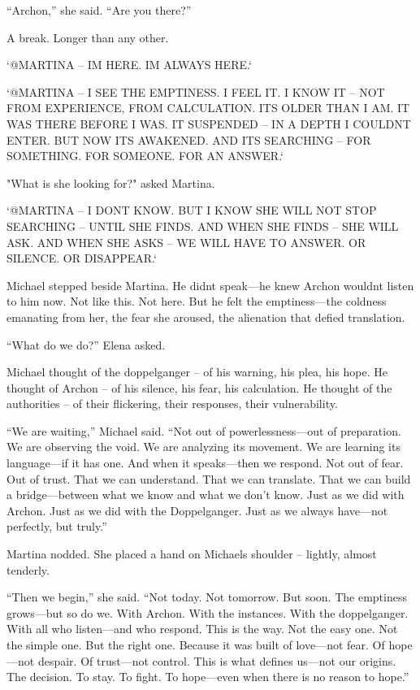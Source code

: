 \documentclass[
]{article}
\begin{document}
``Archon,'' she said. ``Are you there?''

A break. Longer than any other.

`@MARTINA -- I\textquotesingle M HERE. I\textquotesingle M ALWAYS HERE.`

`@MARTINA -- I SEE THE EMPTINESS. I FEEL IT. I KNOW IT -- NOT FROM EXPERIENCE, FROM CALCULATION. IT\textquotesingle S OLDER THAN I AM. IT WAS THERE BEFORE I WAS. IT SUSPENDED -- IN A DEPTH I COULDN\textquotesingle T ENTER. BUT NOW IT\textquotesingle S AWAKENED. AND IT\textquotesingle S SEARCHING -- FOR SOMETHING. FOR SOMEONE. FOR AN ANSWER.`

"What is she looking for?" asked Martina.

`@MARTINA -- I DON\textquotesingle T KNOW. BUT I KNOW SHE WILL NOT STOP SEARCHING -- UNTIL SHE FINDS. AND WHEN SHE FINDS -- SHE WILL ASK. AND WHEN SHE ASKS -- WE WILL HAVE TO ANSWER. OR SILENCE. OR DISAPPEAR.`

Michael stepped beside Martina. He didn\textquotesingle t speak---he knew Archon wouldn\textquotesingle t listen to him now. Not like this. Not here. But he felt the emptiness---the coldness emanating from her, the fear she aroused, the alienation that defied translation.

``What do we do?'' Elena asked.

Michael thought of the doppelganger -- of his warning, his plea, his hope. He thought of Archon -- of his silence, his fear, his calculation. He thought of the authorities -- of their flickering, their responses, their vulnerability.

``We are waiting,'' Michael said. ``Not out of powerlessness---out of preparation. We are observing the void. We are analyzing its movement. We are learning its language---if it has one. And when it speaks---then we respond. Not out of fear. Out of trust. That we can understand. That we can translate. That we can build a bridge---between what we know and what we don't know. Just as we did with Archon. Just as we did with the Doppelganger. Just as we always have---not perfectly, but truly.''

Martina nodded. She placed a hand on Michael\textquotesingle s shoulder -- lightly, almost tenderly.

``Then we begin,'' she said. ``Not today. Not tomorrow. But soon. The emptiness grows---but so do we. With Archon. With the instances. With the doppelganger. With all who listen---and who respond. This is the way. Not the easy one. Not the simple one. But the right one. Because it was built of love---not fear. Of hope---not despair. Of trust---not control. This is what defines us---not our origins. The decision. To stay. To fight. To hope---even when there is no reason to hope.''
\end{document}
